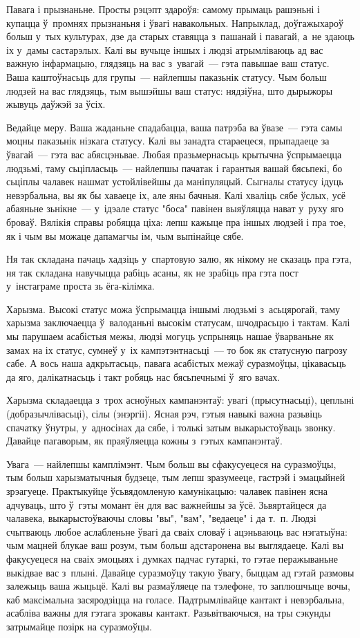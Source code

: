 Павага і прызнаньне. Просты рэцэпт здароўя: самому прымаць рашэньні і купацца ў~промнях прызнаньня і ўвагі навакольных. Напрыклад, доўгажыхароў больш у~тых культурах, дзе да старых ставяцца з~пашанай і павагай, а~не здаюць іх у~дамы састарэлых. Калі вы вучыце іншых і людзі атрымліваюць ад вас важную інфармацыю, глядзяць на вас з~увагай~--- гэта павышае ваш статус. Ваша каштоўнасьць для групы~--- найлепшы паказьнік статусу. Чым больш людзей на вас глядзяць, тым вышэйшы ваш статус: нядзіўна, што дырыжоры жывуць даўжэй за ўсіх.

Ведайце меру. Ваша жаданьне спадабацца, ваша патрэба ва ўвазе~--- гэта самы моцны паказьнік нізкага статусу. Калі вы занадта стараецеся, прыпадаеце за ўвагай~--- гэта вас абясцэньвае. Любая празьмернасьць крытычна ўспрымаецца людзьмі, таму сьціпласьць~--- найлепшы пачатак і гарантыя вашай бясьпекі, бо сьціплы чалавек нашмат устойлівейшы да маніпуляцый. Сыгналы статусу ідуць невэрбальна, вы як бы хаваеце іх, але яны бачныя. Калі хваліць сябе ўслых, усё абаяньне зьнікне~--- у~ідэале статус "боса" павінен выяўляцца нават у~руху яго броваў. Вялікія справы робяцца ціха: лепш кажыце пра іншых людзей і пра тое, як і чым вы можаце дапамагчы ім, чым выпінайце сябе.

Ня так складана пачаць хадзіць у~спартовую залю, як нікому не сказаць пра гэта, ня так складана навучыцца рабіць асаны, як не зрабіць пра гэта пост у~інстаграме проста зь ёга-кілімка.

Харызма. Высокі статус можа ўспрымацца іншымі людзьмі з~асьцярогай, таму харызма заключаецца ў~валоданьні высокім статусам, шчодрасьцю і тактам. Калі мы парушаем асабістыя межы, людзі могуць успрыняць нашае ўварваньне як замах на іх статус, сумнеў у~іх кампэтэнтнасьці~--- то бок як статусную пагрозу сабе. А вось наша адкрытасьць, павага асабістых межаў суразмоўцы, цікавасьць да яго, далікатнасьць і такт робяць нас бясьпечнымі ў~яго вачах.

Харызма складаецца з~трох асноўных кампанэнтаў: увагі (прысутнасьці), цеплыні (добразычлівасьці), сілы (энэргіі). Ясная рэч, гэтыя навыкі важна разьвіць спачатку ўнутры, у~адносінах да сябе, і толькі затым выкарыстоўваць звонку. Давайце пагаворым, як праяўляецца кожны з~гэтых кампанэнтаў.

Увага~--- найлепшы камплімэнт. Чым больш вы сфакусуецеся на суразмоўцы, тым больш харызматычныя будзеце, тым лепш зразумееце, гастрэй і эмацыйней зрэагуеце. Практыкуйце ўсьвядомленую камунікацыю: чалавек павінен ясна адчуваць, што ў~гэты момант ён для вас важнейшы за ўсё. Зьвяртайцеся да чалавека, выкарыстоўваючы словы "вы", "вам", "ведаеце" і да т.~п. Людзі счытваюць любое аслабленьне ўвагі да сваіх словаў і ацэньваюць вас нэгатыўна: чым мацней блукае ваш розум, тым больш адстаронена вы выглядаеце. Калі вы факусуецеся на сваіх эмоцыях і думках падчас гутаркі, то гэтае перажываньне выкідвае вас з~плыні. Давайце суразмоўцу такую ўвагу, быццам ад гэтай размовы залежыць ваша жыцьцё. Калі вы размаўляеце па тэлефоне, то заплюшчыце вочы, каб максімальна засяродзіцца на голасе. Падтрымлівайце кантакт і невэрбальна, асабліва важны для гэтага зрокавы кантакт. Разьвітваючыся, на тры сэкунды затрымайце позірк на суразмоўцы.

